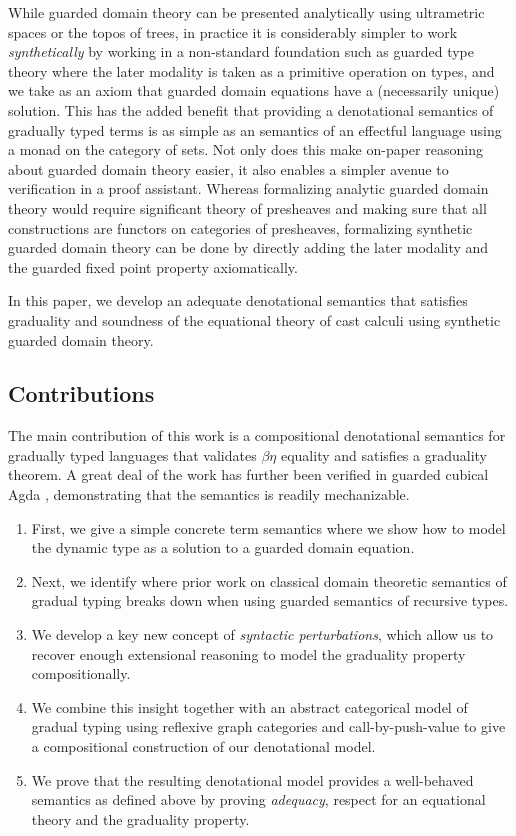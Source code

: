 While guarded domain theory can be presented analytically using
ultrametric spaces or the topos of trees, in practice it is
considerably simpler to work \emph{synthetically} by working in a
non-standard foundation such as guarded type theory where the later
modality is taken as a primitive operation on types, and we take as an
axiom that guarded domain equations have a (necessarily unique)
solution. This has the added benefit that providing a denotational
semantics of gradually typed terms is as simple as an semantics of an
effectful language using a monad on the category of sets. Not only
does this make on-paper reasoning about guarded domain theory easier,
it also enables a simpler avenue to verification in a proof
assistant. Whereas formalizing analytic guarded domain theory would
require significant theory of presheaves and making sure that all
constructions are functors on categories of presheaves, formalizing
synthetic guarded domain theory can be done by directly adding the
later modality and the guarded fixed point property axiomatically.
%



In this paper, we develop an adequate denotational semantics that satisfies
graduality and soundness of the equational theory of cast calculi using
synthetic guarded domain theory.  


\subsection{Contributions}

The main contribution of this work is a compositional denotational
semantics for gradually typed languages that validates $\beta\eta$
equality and satisfies a graduality theorem. A great deal of the work
has further been verified in guarded cubical Agda \cite{veltri-vezzosi2020}, 
demonstrating that the semantics is readily mechanizable.

\begin{enumerate}
\item First, we give a simple concrete term semantics where we show
  how to model the dynamic type as a solution to a guarded domain equation.
\item Next, we identify where prior work on classical domain theoretic
  semantics of gradual typing breaks down when using guarded semantics
  of recursive types.
\item We develop a key new concept of \emph{syntactic perturbations},
  which allow us to recover enough extensional reasoning to model the
  graduality property compositionally.
\item We combine this insight together with an abstract categorical
  model of gradual typing using reflexive graph categories and
  call-by-push-value to give a compositional construction of our
  denotational model.
\item We prove that the resulting denotational model provides a
  well-behaved semantics as defined above by proving \emph{adequacy},
  respect for an equational theory and the graduality property.
\end{enumerate}

